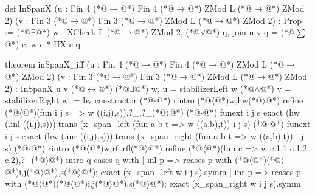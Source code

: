 def InSpanX (u : Fin 4 (*@$\to$@*) Fin 4 (*@$\to$@*) ZMod L (*@$\to$@*) ZMod 2)
    (v : Fin 3 (*@$\to$@*) Fin 3 (*@$\to$@*) ZMod L (*@$\to$@*) ZMod 2) : Prop :=
  (*@$\exists$@*) w : XCheck L (*@$\to$@*) ZMod 2, (*@$\forall$@*) q, join u v q = (*@$\sum$@*) c, w c * HX c q

theorem inSpanX_iff (u : Fin 4 (*@$\to$@*) Fin 4 (*@$\to$@*) ZMod L (*@$\to$@*) ZMod 2)
    (v : Fin 3 (*@$\to$@*) Fin 3 (*@$\to$@*) ZMod L (*@$\to$@*) ZMod 2) :
    InSpanX u v (*@$\leftrightarrow$@*) (*@$\exists$@*) w, u = stabilizerLeft w (*@$\land$@*) v = stabilizerRight w := by
  constructor
  (*@$\cdot$@*) rintro (*@$\langle$@*)w,hw(*@$\rangle$@*)
    refine (*@$\langle$@*)(fun i j s => w ((i,j),s)),?_,?_(*@$\rangle$@*)
    (*@$\cdot$@*) funext i j s
      exact (hw (.inl ((i,j),s))).trans (x_span_left (fun a b t => w ((a,b),t)) i j s)
    (*@$\cdot$@*) funext i j s
      exact (hw (.inr ((i,j),s))).trans (x_span_right (fun a b t => w ((a,b),t)) i j s)
  (*@$\cdot$@*) rintro (*@$\langle$@*)w,rfl,rfl(*@$\rangle$@*)
    refine (*@$\langle$@*)(fun c => w c.1.1 c.1.2 c.2),?_(*@$\rangle$@*)
    intro q
    cases q with
    | inl p => rcases p with (*@$\langle$@*)(*@$\langle$@*)i,j(*@$\rangle$@*),s(*@$\rangle$@*); exact (x_span_left w i j s).symm
    | inr p => rcases p with (*@$\langle$@*)(*@$\langle$@*)i,j(*@$\rangle$@*),s(*@$\rangle$@*); exact (x_span_right w i j s).symm
